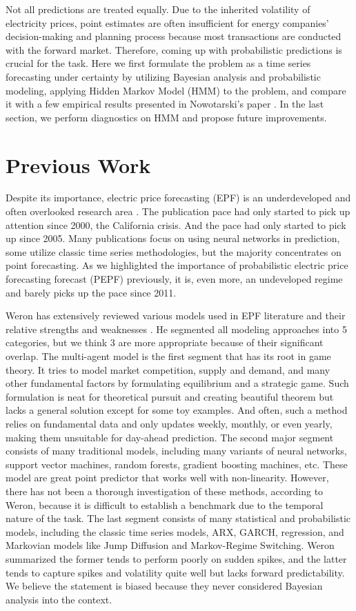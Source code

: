 \documentclass[11pt, letterpaper, journal]{IEEEtran}
\begin{document}
Not all predictions are treated equally. Due to the inherited volatility of electricity prices, point estimates are often insufficient for energy companies' decision-making and planning process because most transactions are conducted with the forward market. Therefore, coming up with probabilistic predictions is crucial for the task. Here we first formulate the problem as a time series forecasting under certainty by utilizing Bayesian analysis and probabilistic modeling, applying Hidden Markov Model (HMM) to the problem, and compare it with a few empirical results presented in Nowotarski's paper \cite{NOWOTARSKI20181548}. In the last section, we perform diagnostics on HMM and propose future improvements.


\section{Previous Work}
Despite its importance, electric price forecasting (EPF) is an underdeveloped and often overlooked research area \cite{NOWOTARSKI20181548}. The publication pace had only started to pick up attention since 2000, the California crisis. And the pace had only started to pick up since 2005. Many publications focus on using neural networks in prediction, some utilize classic time series methodologies, but the majority concentrates on point forecasting. As we highlighted the importance of probabilistic electric price forecasting forecast (PEPF) previously, it is, even more, an undeveloped regime and barely picks up the pace since 2011.

Weron has extensively reviewed various models used in EPF literature and their relative strengths and weaknesses \cite{WERON20141030}. He segmented all modeling approaches into 5 categories, but we think 3 are more appropriate because of their significant overlap. The multi-agent model is the first segment that has its root in game theory. It tries to model market competition, supply and demand, and many other fundamental factors by formulating equilibrium and a strategic game. Such formulation is neat for theoretical pursuit and creating beautiful theorem but lacks a general solution except for some toy examples. And often, such a method relies on fundamental data and only updates weekly, monthly, or even yearly, making them unsuitable for day-ahead prediction. The second major segment consists of many traditional models, including many variants of neural networks, support vector machines, random forests, gradient boosting machines, etc. These model are great point predictor that works well with non-linearity. However, there has not been a thorough investigation of these methods, according to Weron, because it is difficult to establish a benchmark due to the temporal nature of the task. The last segment consists of many statistical and probabilistic models, including the classic time series models, ARX, GARCH, regression, and Markovian models like Jump Diffusion and Markov-Regime Switching. Weron summarized the former tends to perform poorly on sudden spikes, and the latter tends to capture spikes and volatility quite well but lacks forward predictability. We believe the statement is biased because they never considered Bayesian analysis into the context.
\end{document}
